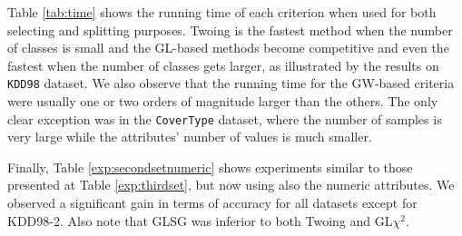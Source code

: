 
Table \ref{tab:time} shows the running time of each criterion  when
used for both selecting and splitting purposes.
Twoing is the fastest method when the number of classes is
small and the GL-based methods become competitive
and even the fastest when the number of classes gets larger,
as illustrated by the results on {\tt KDD98} dataset.
We also observe that  the running time for the
GW-based criteria were usually one or two orders of magnitude
larger than the others. The only clear exception was in the {\tt CoverType} dataset,
where the number of samples is very large while the attributes' number of values
is much smaller.

Finally, Table \ref{exp:secondsetnumeric} shows experiments similar to those presented at Table
\ref{exp:thirdset}, but now using also the numeric attributes. We observed a
significant gain in terms of accuracy for all datasets except for
KDD98-2. Also note that GLSG was inferior to both Twoing and GL$\chi^2$.

